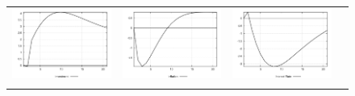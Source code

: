 \begin{figure}
\begin{tabular}{cccc}
\includegraphics[scale=0.22]{results_reinit/Investment_mpshock_irf.png} & 
\includegraphics[scale=0.22]{results_reinit/Inflation_mpshock_irf.png} & 
\includegraphics[scale=0.22]{results_reinit/Interest_Rate_mpshock_irf.png} \\ \\ 

\end{tabular}
\end{figure}
